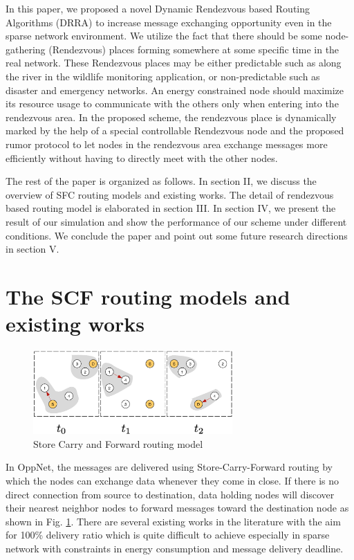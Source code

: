\documentclass[conference]{IEEEtran}
\begin{document}
In this paper, we proposed a novel Dynamic Rendezvous based Routing Algorithms (DRRA) to increase message exchanging opportunity even in the sparse network environment.
We utilize the fact that there should be some node-gathering (Rendezvous) places forming somewhere at some specific time in the real network.
These Rendezvous places may be either predictable such as along the river in the wildlife monitoring application, or non-predictable such as disaster and emergency networks.
An energy constrained node should maximize its resource usage to communicate with the others only when entering into the rendezvous area.
In the proposed scheme, the rendezvous place is dynamically marked by the help of a special controllable Rendezvous node and the proposed rumor protocol to let nodes in the rendezvous area exchange messages more efficiently without having to directly meet with the other nodes.

The rest of the paper is organized as follows. 
In section II, we discuss the  overview of SFC routing models and existing works. 
The detail of rendezvous based routing model is elaborated in section III.
In section IV, we present the result of our simulation and show the performance of our scheme under different conditions.
We conclude the paper and point out some future research directions in section V.   


\section{The SCF routing models and existing works}
\begin{figure}[!t]
	\centering
	\includegraphics[width=3in]{Figures/SFC.pdf}
	\caption{Store Carry and Forward routing model}
	\label{SFC}
\end{figure}

In OppNet, the messages are delivered using Store-Carry-Forward routing by which  the nodes can exchange data whenever they come in close.
If there is no direct connection from source to destination, data holding nodes will discover their nearest neighbor nodes to forward messages toward the destination node as shown in Fig. \ref{SFC}.
There are several existing works in the literature \cite{Vahdat2000, Harras2005, Neena2013, Lindgren2003,Brendan2005,Boldrini2007,Kerdsri2013} with the aim for 100\% delivery ratio which is quite difficult to achieve especially in sparse network with constraints in energy consumption and message delivery deadline.
\end{document}
